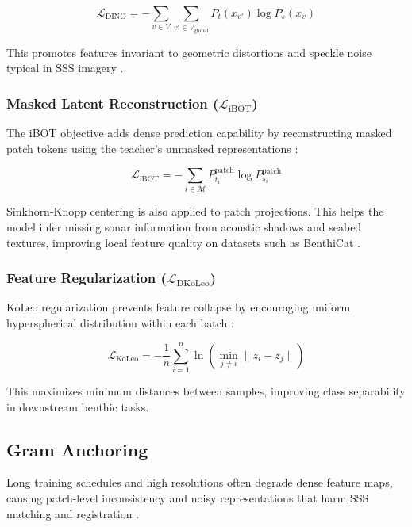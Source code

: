 \documentclass[12pt]{article}
\begin{document}
\begin{equation}
\mathcal{L}_{\text{DINO}} = -\sum_{v \in V} \sum_{v' \in V_{\text{global}}} P_t(x_{v'}) \log P_s(x_v)
\end{equation}

This promotes features invariant to geometric distortions and speckle noise typical in SSS imagery \cite{hayat2025}.

\subsubsection{Masked Latent Reconstruction ($\mathcal{L}_{\text{iBOT}}$)}

The iBOT objective adds dense prediction capability by reconstructing masked patch tokens using the teacher's unmasked representations \cite{oquab2024, oriane2025}:

\begin{equation}
\mathcal{L}_{\text{iBOT}} = -\sum_{i \in \mathcal{M}} P_{t_i}^{\text{patch}} \log P_{s_i}^{\text{patch}}
\end{equation}

Sinkhorn-Knopp centering is also applied to patch projections. This helps the model infer missing sonar information from acoustic shadows and seabed textures, improving local feature quality on datasets such as BenthiCat \cite{hayat2025, oriane2025}.

\subsubsection{Feature Regularization ($\mathcal{L}_{\text{DKoLeo}}$)}

KoLeo regularization prevents feature collapse by encouraging uniform hyperspherical distribution within each batch \cite{oquab2024, oriane2025}:

\begin{equation}
\mathcal{L}_{\text{KoLeo}} = -\frac{1}{n} \sum_{i=1}^{n} \ln \left( \min_{j \neq i} \| z_i - z_j \| \right)
\end{equation}

This maximizes minimum distances between samples, improving class separability in downstream benthic tasks.

\subsection{Gram Anchoring}

Long training schedules and high resolutions often degrade dense feature maps, causing patch-level inconsistency and noisy representations that harm SSS matching and registration \cite{oriane2025, katrusha2025}.
\end{document}
